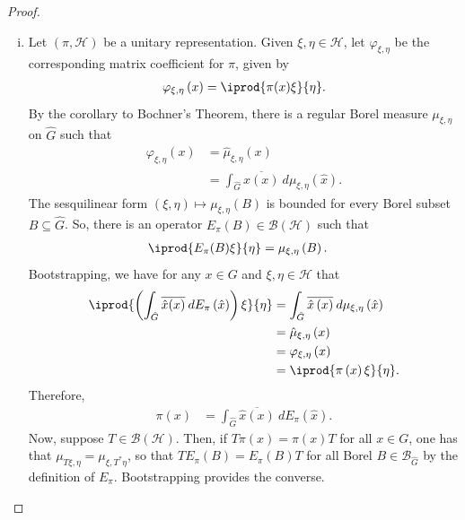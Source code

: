 \documentclass[10pt]{mypackage}
\begin{document}
\begin{proof}\hfill
  \begin{enumerate}[(i)]
    \item Let $\left( \pi,\mathscr{H} \right)$ be a unitary representation. Given $\xi,\eta\in \mathscr{H}$, let $\varphi_{\xi,\eta}$ be the corresponding matrix coefficient for $\pi$, given by
      \begin{align*}
        \varphi_{\xi,\eta}\left( x \right) = \iprod{\pi(x)\xi}{\eta}.
      \end{align*}
      By the corollary to Bochner's Theorem, there is a regular Borel measure $\mu_{\xi,\eta}$ on $\hat{G}$ such that
      \begin{align*}
        \varphi_{\xi,\eta}\left( x \right) &= \hat{\mu}_{\xi,\eta}\left( x \right)\\
                                           &= \int_{\hat{G}}^{} \overline{\hat{x}\left( x \right)}\:d\mu_{\xi,\eta}\left( \hat{x} \right).
      \end{align*}
      The sesquilinear form $\left( \xi,\eta \right)\mapsto \mu_{\xi,\eta}\left( B \right)$ is bounded for every Borel subset $B\subseteq \hat{G}$. So, there is an operator $E_{\pi}\left( B \right)\in \mathcal{B}\left( \mathscr{H} \right)$ such that
      \begin{align*}
        \iprod{E_{\pi}(B)\xi}{\eta} &= \mu_{\xi,\eta}\left( B \right).
      \end{align*}
      Bootstrapping, we have for any $x\in G$ and $\xi,\eta\in \mathscr{H}$ that
      \begin{align*}
        \iprod{ \left( \int_{\hat{G}}^{} \overline{\hat{x}(x)}\:dE_{\pi}\left( \hat{x} \right) \right)\xi }{\eta} &= \int_{\hat{G}}^{} \overline{\hat{x}\left( x \right)}\:d\mu_{\xi,\eta}\left( \hat{x} \right)\\
                             &= \hat{\mu}_{\xi,\eta}\left( x \right)\\
                             &= \varphi_{\xi,\eta}\left( x \right)\\
                             &= \iprod{\pi\left( x \right)\xi}{\eta}.
      \end{align*}
      Therefore, 
      \begin{align*}
        \pi(x) &= \int_{\hat{G}}^{} \overline{\hat{x}(x)}\:dE_{\pi}\left( \hat{x} \right).
      \end{align*}
      Now, suppose $T\in \mathcal{B}\left( \mathscr{H} \right)$. Then, if $T\pi(x) = \pi(x)T$ for all $x\in G$, one has that $\mu_{T\xi,\eta} = \mu_{\xi,T^{\ast}\eta}$, so that $TE_{\pi}(B) = E_{\pi}(B)T$ for all Borel $B\in \mathcal{B}_{\hat{G}}$ by the definition of $E_{\pi}$. Bootstrapping provides the converse.

\end{enumerate}
\end{proof}
\end{document}
